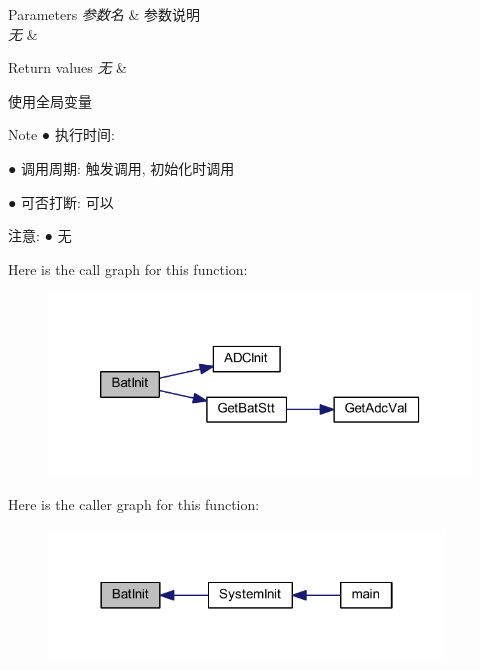 \begin{DoxyParams}{\-Parameters}
{\em 参数名} & 参数说明 \\
\hline
{\em 无} & \\
\hline
\end{DoxyParams}

\begin{DoxyRetVals}{\-Return values}
{\em 无} & \\
\hline
\end{DoxyRetVals}
\begin{DoxyParagraph}{使用全局变量 }

\end{DoxyParagraph}
\begin{DoxyNote}{\-Note}
● 执行时间\-: \par
 ● 调用周期\-: 触发调用, 初始化时调用 \par
 ● 可否打断\-: 可以 \par

\end{DoxyNote}
\begin{DoxyParagraph}{注意\-:}
● 无 \par
 
\end{DoxyParagraph}


\-Here is the call graph for this function\-:\nopagebreak
\begin{figure}[H]
\begin{center}
\leavevmode
\includegraphics[width=320pt]{group___b_e_t_t_e_r_y_ga9daea963d01ab321f8f2cb6f2b8932b2_cgraph}
\end{center}
\end{figure}




\-Here is the caller graph for this function\-:\nopagebreak
\begin{figure}[H]
\begin{center}
\leavevmode
\includegraphics[width=298pt]{group___b_e_t_t_e_r_y_ga9daea963d01ab321f8f2cb6f2b8932b2_icgraph}
\end{center}
\end{figure}


